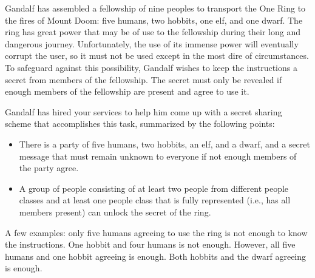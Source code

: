 \documentclass[11pt]{article}
\begin{document}

Gandalf has assembled a fellowship of nine peoples to transport the One Ring to the fires of Mount Doom: five humans, two hobbits, one elf, and one dwarf. The ring has great power that may be of use to the fellowship during their long and dangerous journey. Unfortunately, the use of its immense power will eventually corrupt the user, so it must not be used except in the most dire of circumstances. To safeguard against this possibility, Gandalf wishes to keep the instructions a secret from members of the fellowship. The secret must only be revealed if enough members of the fellowship are present and agree to use it.

Gandalf has hired your services to help him come up with a secret sharing scheme that accomplishes this task, summarized by the following points:
\begin{itemize}

\item There is a party of five humans, two hobbits, an elf, and a dwarf, and a secret message that must remain unknown to everyone if not enough members of the party agree.
\item A group of people consisting of at least two people from different people classes and at least one people class that is fully represented (i.e., has all members present) can unlock the secret of the ring.

\end{itemize}

A few examples: only five humans agreeing to use the ring is not enough to know the instructions. One hobbit and four humans is not enough. However, all five humans and one hobbit agreeing is enough. Both hobbits and the dwarf agreeing is enough.
\end{document}
